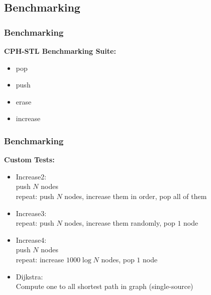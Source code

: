\documentclass{beamer}
\begin{document}
\begin{frame}
\subsection{Benchmarking}
\frametitle{Benchmarking}



\textbf{CPH-STL Benchmarking Suite:}
\begin{itemize}
\item pop
\item push
\item erase
\item increase
\end{itemize}


\end{frame}

\begin{frame}
\frametitle{Benchmarking}

\textbf{Custom Tests:}
\begin{itemize}
\item Increase2:\\
  push $N$ nodes\\
  repeat: push $N$ nodes, increase them in order, pop all of them
\item Increase3: \\
  repeat: push $N$ nodes, increase them randomly, pop $1$ node
\item Increase4: \\
  push $N$ nodes \\
  repeat: increase $1000 \log N$ nodes, pop $1$ node
\item Dijkstra: \\
  Compute one to all shortest path in graph (single-source)
\end{itemize}

\end{frame}
\end{document}
